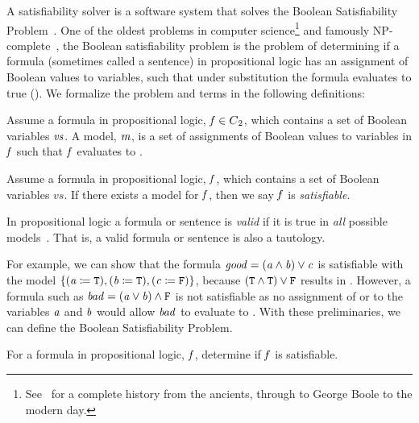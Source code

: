 \label{section:sat-solving}
%

A satisfiability solver is a software system that solves the Boolean
Satisfiability Problem~\cite{russelNorvig}. One of the oldest problems in
computer science\footnote{See~\citet{BBH+09} for a complete history from the
  ancients, through to George Boole to the modern day.} and famously
NP-complete~\cite{10.1145/800157.805047}, the Boolean satisfiability problem is
the problem of determining if a formula (sometimes called a sentence) in
propositional logic has an assignment of Boolean values to variables, such that
under substitution the formula evaluates to true (\tru{}). We formalize the
problem and terms in the following definitions:

\begin{definition}[Model]
  Assume a formula in propositional logic, $\mathit{f} \in {C\textsubscript{2}}{}$, which contains a
  set of Boolean variables $\mathit{vs}$. A model, $\mathit{m}$, is a set of assignments
  of Boolean values to variables in $\mathit{f}$ such that $\mathit{f}$ evaluates to
  \tru{}.
\end{definition}

\begin{definition}[Satisfiable]
  Assume a formula in propositional logic, $\mathit{f}$, which contains a set of
  Boolean variables $vs$. If there exists a model for $\mathit{f}$, then we say
  $\mathit{f}$ is \emph{satisfiable}.
\end{definition}
%
\begin{definition}[Validity]
  In propositional logic a formula or sentence is \emph{valid} if it is true in
  \emph{all} possible models~\cite{russelNorvig}. That is, a valid formula or
  sentence is also a tautology.
\end{definition}


For example, we can show that the formula $\mathit{good = (a \wedge b) \vee c}$ is
satisfiable with the model $\{\mathit{(a \coloneqq{}{} \texttt{T}{}), (b \coloneqq{}{} \texttt{T}{}), (c
  \coloneqq{}{} \texttt{F}{})}\}$, because $(\texttt{T}{} \wedge{} \texttt{T}{}) \vee{} \texttt{F}{}$
results in \tru{}. However, a formula such as $\mathit{bad = (a \vee b) \wedge
  \texttt{F}{}}$ is not satisfiable as no assignment of \fls{} or \tru{} to the
variables $\mathit{a}$ and $\mathit{b}$ would allow $\mathit{bad}$ to evaluate to \tru{}.
With these preliminaries, we can define the Boolean Satisfiability Problem.

\begin{definition}
  For a formula in propositional logic, $\mathit{f}$, determine if $\mathit{f}$ is
  satisfiable.~\cite{russelNorvig}
\end{definition}


